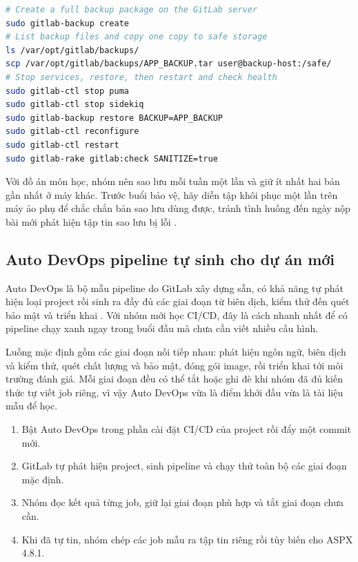 \begin{lstlisting}[language=bash, caption={Sao luu va khoi phuc GitLab tu host}, label={lst:c53-backup}]
# Create a full backup package on the GitLab server
sudo gitlab-backup create
# List backup files and copy one copy to safe storage
ls /var/opt/gitlab/backups/
scp /var/opt/gitlab/backups/APP_BACKUP.tar user@backup-host:/safe/
# Stop services, restore, then restart and check health
sudo gitlab-ctl stop puma
sudo gitlab-ctl stop sidekiq
sudo gitlab-backup restore BACKUP=APP_BACKUP
sudo gitlab-ctl reconfigure
sudo gitlab-ctl restart
sudo gitlab-rake gitlab:check SANITIZE=true
\end{lstlisting}

Với đồ án môn học, nhóm nên sao lưu mỗi tuần một lần và giữ ít nhất hai bản gần nhất ở máy khác. Trước buổi bảo vệ, hãy diễn tập khôi phục một lần trên máy ảo phụ để chắc chắn bản sao lưu dùng được, tránh tình huống đến ngày nộp bài mới phát hiện tập tin sao lưu bị lỗi \cite{progit}.

\subsection{Auto DevOps pipeline tự sinh cho dự án mới}

Auto DevOps là bộ mẫu pipeline do GitLab xây dựng sẵn, có khả năng tự phát hiện loại project rồi sinh ra đầy đủ các giai đoạn từ biên dịch, kiểm thử đến quét bảo mật và triển khai \cite{gitlabci}. Với nhóm mới học CI/CD, đây là cách nhanh nhất để có pipeline chạy xanh ngay trong buổi đầu mà chưa cần viết nhiều cấu hình.

Luồng mặc định gồm các giai đoạn nối tiếp nhau: phát hiện ngôn ngữ, biên dịch và kiểm thử, quét chất lượng và bảo mật, đóng gói image, rồi triển khai tới môi trường đánh giá. Mỗi giai đoạn đều có thể tắt hoặc ghi đè khi nhóm đã đủ kiến thức tự viết job riêng, vì vậy Auto DevOps vừa là điểm khởi đầu vừa là tài liệu mẫu để học.

\begin{enumerate}
    \item Bật Auto DevOps trong phần cài đặt CI/CD của project rồi đẩy một commit mới.
    \item GitLab tự phát hiện project, sinh pipeline và chạy thử toàn bộ các giai đoạn mặc định.
    \item Nhóm đọc kết quả từng job, giữ lại giai đoạn phù hợp và tắt giai đoạn chưa cần.
    \item Khi đã tự tin, nhóm chép các job mẫu ra tập tin riêng rồi tùy biến cho ASPX 4.8.1.
\end{enumerate}

